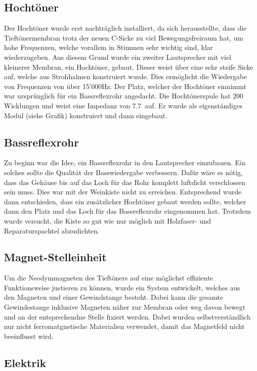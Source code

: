 \documentclass[a4paper,11pt]{report}
\begin{document}
\subsection{Hochtöner}
Der Hochtöner wurde erst nachträglich installiert, da sich herausstellte, dass die Tieftönermembran trotz der neuen C-Sicke zu viel Bewegungsfreiraum hat, um hohe Frequenzen, welche vorallem in Stimmen sehr wichtig sind, klar wiederzugeben. Aus diesem Grund wurde ein zweiter Lautsprecher mit viel kleinerer Membran, ein Hochtöner, gebaut. Dieser weist über eine sehr steife Sicke auf, welche aus Strohhalmen konstruiert wurde. Dies ermöglicht die Wiedergabe von Frequenzen von über 15'000Hz. Der Platz, welcher der Hochtöner einnimmt war ursprünglich für ein Bassreflexrohr angedacht. Die Hochtönerspule hat 200 Wicklungen und weist eine Impedanz von 7.7\Omega\  auf. Er wurde als eigenständiges Modul (siehe Grafik) konstruiert und dann eingebaut.

\subsection{Bassreflexrohr}
Zu beginn war die Idee, ein Bassreflexrohr in den Lautsprecher einzubauen. Ein solches sollte die Qualität der Basswiedergabe verbessern. Dafür wäre es nötig, dass das Gehäuse bis auf das Loch für das Rohr komplett luftdicht verschlossen sein muss. Dies war mit der Weinkiste nicht zu erreichen. Entsprechend wurde dann entschieden, dass ein zusätzlicher Hochtöner gebaut werden sollte, welcher dann den Platz und das Loch für das Bassreflexrohr eingenommen hat. Trotzdem wurde versucht, die Kiste so gut wie nur möglich mit Holzfaser- und Reparaturspachtel abzudichten. 

\subsection{Magnet-Stelleinheit}
Um die Neodymmagneten des Tieftöners auf eine möglichst effiziente Funktionsweise justieren zu können, wurde ein System entwickelt, welches aus den Magneten und einer Gewindstange besteht. Dabei kann die gesamte Gewindestange inklusive Magneten näher zur Membran oder weg davon bewegt und an der entsprechendne Stelle fixiert werden. Dabei wurden selbstverständlich nur nicht ferromatgnetische Materialien verwendet, damit das Magnetfeld nicht beeinflusst wird.

\subsection{Elektrik}
\end{document}
